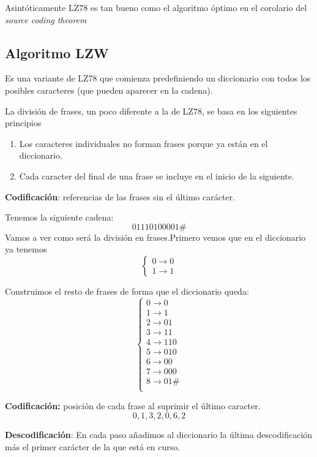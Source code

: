 \obs Asintóticamente LZ78 es tan bueno como el algoritmo óptimo en el corolario del \textit{source coding theorem}

\subsection{Algoritmo LZW}

Es una variante de LZ78 que comienza predefiniendo un diccionario con todos los posibles caracteres (que pueden aparecer en la cadena).

La división de frases, un poco diferente a la de LZ78, se basa en los siguientes principios
\begin{enumerate}
	\item Los caracteres individuales no forman frases porque ya están en el diccionario.
	\item Cada caracter del final de una frase se incluye en el inicio de la siguiente.
\end{enumerate}

\textbf{Codificación}: referencias de las frases sin el último carácter.


\begin{example}
	Tenemos la siguiente cadena:
	$$01110100001\#$$
	Vamos a ver como será la división en frases.Primero vemos que en el diccionario ya tenemos
	$$\begin{cases}
	0 \rightarrow 0\\
	1 \rightarrow 1
	\end{cases}$$

	Construimos el resto de frases de forma que el diccionario queda:
		$$\begin{cases}
		0 \rightarrow 0\\
		1 \rightarrow 1\\
		2 \rightarrow 01\\
		3 \rightarrow 11\\
		4 \rightarrow 110\\
		5 \rightarrow 010\\
		6 \rightarrow 00\\
		7 \rightarrow 000\\
		8 \rightarrow 01\#\\
		\end{cases}$$

	\textbf{Codificación:} posición de cada frase al suprimir el último caracter.
	$$0,1,3,2,0,6,2$$
\end{example}

\textbf{Descodificación}: En cada paso añadimos al diccionario la última descodificación más el primer carácter de la que está en curso.

